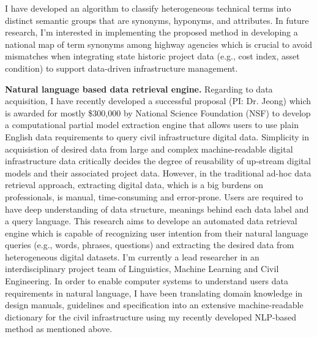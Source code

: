 \documentclass[a4paper,11pt]{article}
\begin{document}
%
%
%
I have developed an algorithm to classify heterogeneous technical terms into distinct semantic groups that are synonyms, hyponyms, and attributes.
%
In future research, I'm interested in implementing the proposed method in developing a national map of term synonyms among highway agencies which is crucial to avoid mismatches when integrating state historic project data (e.g., cost index, asset condition) to support data-driven infrastructure management. 
\par
{\bf Natural language based data retrieval engine.} Regarding to data acquisition, I have recently developed a successful proposal (PI: Dr. Jeong) which is awarded for mostly \$300,000 by National Science Foundation (NSF) to develop a computational partial model extraction engine that allows users to use plain English data requirements to query civil infrastructure digital data.
%
Simplicity in acquisistion of desired data from large and complex machine-readable digital infrastructure data critically decides the degree of reusability of up-stream digital models and their associated project data. 
%
However, in the traditional ad-hoc data retrieval approach, extracting digital data, which is a big burdens on professionals, is manual, time-consuming and error-prone. Users are required to have deep understanding of data structure, meanings behind each data label and a query language. 
%
This research aims to develope an automated data retrieval engine which is capable of recognizing user intention from their natural language queries (e.g., words, phrases, questions) and extracting the desired data from heterogeneous digital datasets.
%
I'm currently a lead researcher in an interdisciplinary project team of Linguistics, Machine Learning and Civil Engineering. 
%
In order to enable computer systems to understand users data requirements in natural language, I have been translating domain knowledge in design manuals, guidelines and specification into an extensive machine-readable dictionary for the civil infrastructure using my recently developed NLP-based method as mentioned above.
\end{document}
